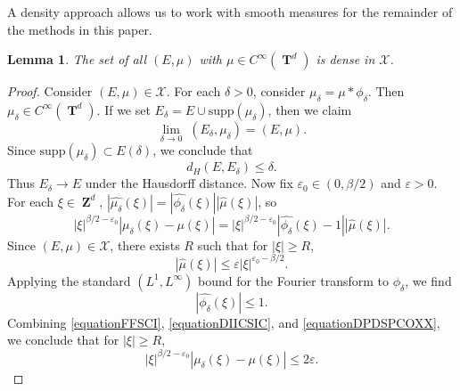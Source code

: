 \documentclass[12pt,reqno]{article}
\numberwithin{equation}{section}
\DeclareMathOperator{\ZZ}{\mathbf{Z}}
\DeclareMathOperator{\TT}{\mathbf{T}}
\newtheorem{lemma}[theorem]{Lemma}
\begin{document}
A density approach allows us to work with smooth measures for the remainder of the methods in this paper.

\begin{lemma} \label{smoothdensitylemma}
    The set of all $(E,\mu)$ with $\mu \in C^\infty(\TT^d)$ is dense in $\mathcal{X}$.
\end{lemma}
\begin{proof}
    Consider $(E,\mu) \in \mathcal{X}$. For each $\delta > 0$, consider $\mu_\delta = \mu * \phi_\delta$. Then $\mu_\delta \in C^\infty(\TT^d)$. If we set $E_\delta = E \cup \text{supp}(\mu_\delta)$, then we claim
    \begin{equation} \label{equationFFSPCOS}
        \lim_{\delta \to 0}\; (E_\delta, \mu_\delta) = (E,\mu).
    \end{equation}
    Since $\text{supp}(\mu_\delta) \subset E(\delta)$, we conclude that
    \begin{equation} \label{equationFFSICSI}
        d_H(E,E_\delta) \leq \delta.
    \end{equation}
    Thus $E_\delta \to E$ under the Hausdorff distance. Now fix $\varepsilon_0 \in (0,\beta/2)$ and $\varepsilon > 0$. For each $\xi \in \ZZ^d$, $|\widehat{\mu_\delta}(\xi)| = |\widehat{\phi_\delta}(\xi)| |\widehat{\mu}(\xi)|$, so
    \begin{equation} \label{equationFFSCI}
        |\xi|^{\beta/2 - \varepsilon_0} |\mu_\delta(\xi) - \mu(\xi)| = |\xi|^{\beta/2 - \varepsilon_0} |\widehat{\phi_\delta}(\xi) - 1| |\widehat{\mu}(\xi)|.
    \end{equation}
    Since $(E,\mu) \in \mathcal{X}$, there exists $R$ such that for $|\xi| \geq R$,
    \begin{equation} \label{equationDIICSIC}
        |\widehat{\mu}(\xi)| \leq \varepsilon |\xi|^{\varepsilon_0-\beta/2}.
    \end{equation}
    Applying the standard $(L^1,L^\infty)$ bound for the Fourier transform to $\phi_\delta$, we find
    \begin{equation} \label{equationDPDSPCOXX}
        |\widehat{\phi_\delta}(\xi)| \leq 1.
    \end{equation}
    Combining \eqref{equationFFSCI}, \eqref{equationDIICSIC}, and \eqref{equationDPDSPCOXX}, we conclude that for $|\xi| \geq R$,
    \begin{equation} \label{equationDSCISIIXX}
        |\xi|^{\beta/2 - \varepsilon_0} |\mu_\delta(\xi) - \mu(\xi)| \leq 2 \varepsilon.
    \end{equation}

\end{proof}
\end{document}
